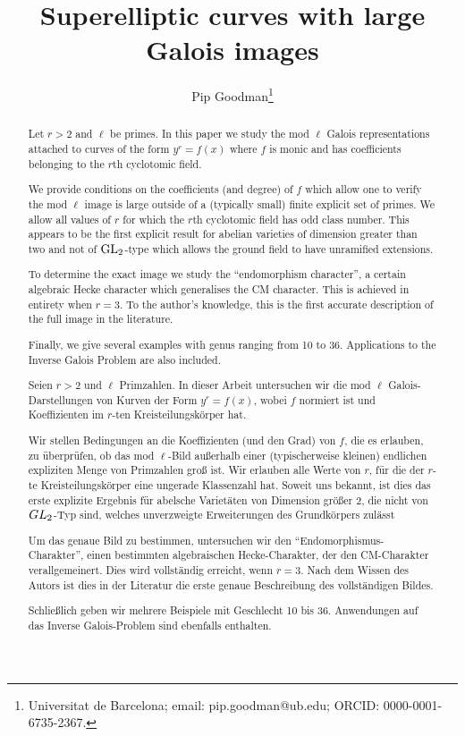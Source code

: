 \documentclass[11pt,a4paper]{article}
\title{Superelliptic curves with large Galois images}
\author{Pip Goodman\footnote{Universitat de Barcelona; email: pip.goodman@ub.edu; ORCID: 0000-0001-6735-2367.} }
\date{}
\begin{document}
\maketitle
{}
\begin{abstract}
    Let $r>2$ and $\ell$ be primes. In this paper we study the mod $\ell$ Galois representations attached to curves of the form $y^r = f(x)$ where $f$ is monic and has coefficients belonging to the $r$th cyclotomic field.
    
    We provide conditions on the coefficients (and degree) of $f$ which allow one to verify the mod $\ell$ image is large outside of a (typically small) finite explicit set of primes. We allow all values of $r$ for which the $r$th cyclotomic field has odd class number. This appears to be the first explicit result for abelian varieties of dimension greater than two and not of $\GL_2$-type which allows the ground field to have unramified extensions.
    
    To determine the exact image we study the ``endomorphism character'', a certain algebraic Hecke character which generalises the CM character.
    This is achieved in entirety when $r=3$. To the author's knowledge, this is the first accurate description of the full image in the literature.
    
    Finally, we give several examples with genus ranging from 10 to 36. Applications to the Inverse Galois Problem are also included.
\end{abstract}
\begin{abstract}
    Seien $r>2$ und $\ell$ Primzahlen. In dieser Arbeit untersuchen wir die mod $\ell$ Galois-Darstellungen von Kurven der Form $y^r = f(x)$, wobei $f$ normiert ist und Koeffizienten im $r$-ten Kreisteilungskörper hat.
    
    Wir stellen Bedingungen an die Koeffizienten (und den Grad) von $f$, die es erlauben, zu überprüfen, ob das mod $\ell$-Bild außerhalb einer (typischerweise kleinen) endlichen expliziten Menge von Primzahlen groß ist. Wir erlauben alle Werte von $r$, für die der $r$-te Kreisteilungskörper eine ungerade Klassenzahl hat.
    Soweit uns bekannt, ist dies das erste explizite Ergebnis für abelsche Varietäten von Dimension größer 2, die nicht von ${\rm GL}_2$-Typ sind, welches unverzweigte Erweiterungen des Grundkörpers zulässt
    
    Um das genaue Bild zu bestimmen, untersuchen wir den ``Endomorphismus-Charakter'', einen bestimmten algebraischen Hecke-Charakter, der den CM-Charakter verallgemeinert.
    Dies wird vollständig erreicht, wenn $r=3$. Nach dem Wissen des Autors ist dies in der Literatur die erste genaue Beschreibung des vollständigen Bildes.
    
    Schließlich geben wir mehrere Beispiele mit  Geschlecht 10 bis 36. Anwendungen auf das Inverse Galois-Problem sind ebenfalls enthalten.
\end{abstract}
\end{document}
